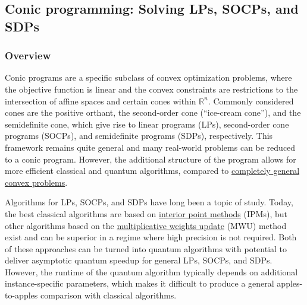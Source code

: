 \begin{refsection}
\subsection{Conic programming: Solving LPs, SOCPs, and SDPs }\label{appl:ConicProgramming}

\subsubsection*{Overview}
Conic programs are a specific subclass of convex optimization problems, where the objective function is linear and the convex constraints are restrictions to the intersection of affine spaces and certain cones within $\mathbb{R}^n$. Commonly considered cones are the positive orthant, the second-order cone (``ice-cream cone''), and the semidefinite cone, which give rise to linear programs (LPs), second-order cone programs (SOCPs), and semidefinite programs (SDPs), respectively. This framework remains quite general and many real-world problems can be reduced to a conic program. However, the additional structure of the program allows for more efficient classical and quantum algorithms, compared to \hyperref[appl:GeneralConvexOpt]{completely general convex problems}. 

Algorithms for LPs, SOCPs, and SDPs have long been a topic of study.
Today, the best classical algorithms are based on \hyperref[prim:QIPM]{interior point methods} (IPMs), but other algorithms based on the \hyperref[prim:MWU]{multiplicative weights update} (MWU) method exist and can be superior in a regime where high precision is not required. Both of these approaches can be turned into quantum algorithms with potential to deliver asymptotic quantum speedup for general LPs, SOCPs, and SDPs. However, the runtime of the quantum algorithm typically depends on additional instance-specific parameters, which makes it difficult to produce a general apples-to-apples comparison with classical algorithms.


\end{refsection}
